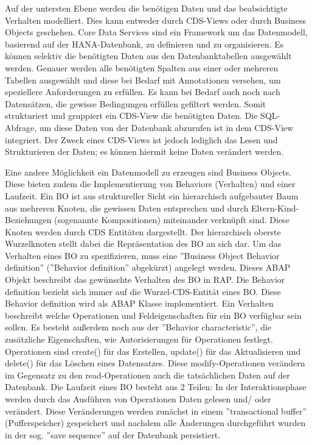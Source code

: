 Auf der untersten Ebene werden die benötigen Daten und das beabsichtigte Verhalten modelliert. Dies kann entweder durch CDS-Views oder durch Business Objects geschehen. Core Data Services sind ein Framework um das Datenmodell, basierend auf der HANA-Datenbank, zu definieren und zu organisieren. Es können selektiv die benötigten Daten aus den Datenbanktabellen ausgewählt werden. Genauer werden alle benötigten Spalten aus einer oder mehreren Tabellen ausgewählt und diese bei Bedarf  mit Annotationen versehen, um speziellere Anforderungen zu erfüllen. Es kann bei Bedarf auch noch nach Datensätzen, die gewisse Bedingungen erfüllen gefiltert werden. Somit strukturiert und gruppiert ein CDS-View die benötigten Daten. Die SQL-Abfrage, um diese Daten von der Datenbank abzurufen ist in dem CDS-View integriert. Der Zweck eines CDS-Views ist jedoch lediglich das Lesen und Strukturieren der Daten; es können hiermit keine Daten verändert werden.

Eine andere Möglichkeit ein Datenmodell zu erzeugen sind Business Objects. Diese bieten zudem die Implementierung von Behaviors (Verhalten) und einer Laufzeit. Ein BO ist aus struktureller Sicht ein hierarchisch aufgebauter Baum aus mehreren Knoten, die gewissen Daten entsprechen und durch Eltern-Kind-Beziehungen (sogenannte Kompositionen) miteinander verknüpft sind. Diese Knoten werden durch CDS Entitäten dargestellt. Der hierarchisch oberste Wurzelknoten stellt dabei die Repräsentation des BO an sich dar. Um das Verhalten eines BO zu spezifizieren, muss eine ''Business Object Behavior definition'' (''Behavior definition'' abgekürzt) angelegt werden. Dieses ABAP Objekt beschreibt das gewünschte Verhalten des BO in RAP. Die Behavior definition bezieht sich immer auf die Wurzel-CDS-Entität eines BO. Diese Behavior definition wird als ABAP Klasse implementiert. Ein Verhalten beschreibt welche Operationen und Feldeigenschaften für ein BO verfügbar sein sollen. Es besteht au{\ss}erdem noch aus der ''Behavior characteristic'', die zusätzliche Eigenschaften, wie \zB Autorisierungen für Operationen festlegt. Operationen sind \zB create() für das Erstellen, update() für das Aktualisieren und delete() für das Löschen eines Datensatzes. Diese modify-Operationen verändern im Gegensatz zu den read-Operationen auch die tatsächlichen Daten auf der Datenbank. Die Laufzeit eines BO besteht aus 2 Teilen: In der Interaktionsphase werden durch das Ausführen von Operationen Daten gelesen und/ oder verändert. Diese Veränderungen werden zunächst in einem ''transactional buffer'' (Pufferspeicher) gespeichert und nachdem alle Änderungen durchgeführt wurden in der sog. ''save sequence'' auf der Datenbank persistiert.

